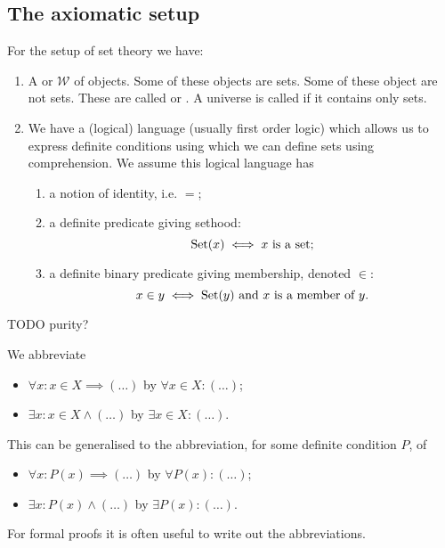 \subsection{The axiomatic setup}
For the setup of set theory we have:
\begin{enumerate}
\item A  or  $\mathcal{W}$ of objects. Some of these objects are sets. Some of these object are not sets. These are called  or . A universe is called  if it contains only sets.
\item We have a (logical) language (usually first order logic) which allows us to express definite conditions using which we can define sets using comprehension. We assume this logical language has
\begin{enumerate}
\item a notion of identity, i.e. $=$;
\item a definite predicate giving sethood:
\[ \operatorname{Set}(x) \iff \text{$x$ is a set}; \]
\item a definite binary predicate giving membership, denoted $\in$:
\[ x\in y \iff \text{$\operatorname{Set}(y)$ and $x$ is a member of $y$}. \]
\end{enumerate}
\end{enumerate}

TODO purity?

\begin{note}
We abbreviate
\begin{itemize}
\item $\forall x: x\in X \implies (\ldots)$ by $\forall x\in X: (\ldots)$;
\item $\exists x: x\in X \land (\ldots)$ by $\exists x\in X: (\ldots)$.
\end{itemize}
This can be generalised to the abbreviation, for some definite condition $P$, of
\begin{itemize}
\item $\forall x: P(x) \implies (\ldots)$ by $\forall P(x): (\ldots)$;
\item $\exists x: P(x) \land (\ldots)$ by $\exists P(x): (\ldots)$.
\end{itemize}
For formal proofs it is often useful to write out the abbreviations.
\end{note}

